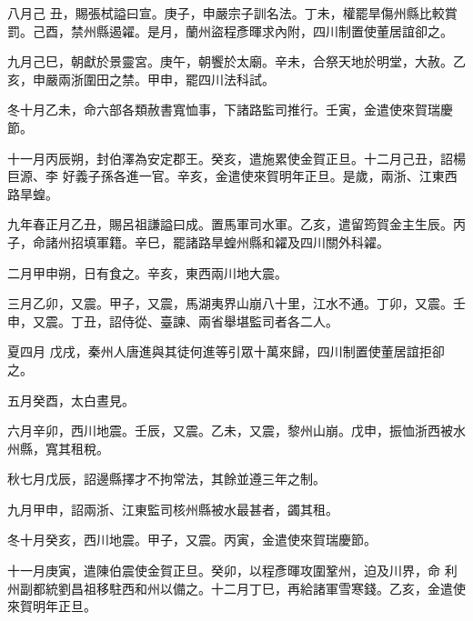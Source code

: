 \begin{pinyinscope}
 八月己
 丑，賜張栻謚曰宣。庚子，申嚴宗子訓名法。丁未，權罷旱傷州縣比較賞罰。己酉，禁州縣遏糴。是月，蘭州盜程彥暉求內附，四川制置使董居誼卻之。



 九月己巳，朝獻於景靈宮。庚午，朝饗於太廟。辛未，合祭天地於明堂，大赦。乙亥，申嚴兩浙圍田之禁。甲申，罷四川法科試。



 冬十月乙未，命六部各類赦書寬恤事，下諸路監司推行。壬寅，金遣使來賀瑞慶節。



 十一月丙辰朔，封伯澤為安定郡王。癸亥，遣施累使金賀正旦。十二月己丑，詔楊巨源、李
 好義子孫各進一官。辛亥，金遣使來賀明年正旦。是歲，兩浙、江東西路旱蝗。



 九年春正月乙丑，賜呂祖謙謚曰成。置馬軍司水軍。乙亥，遣留筠賀金主生辰。丙子，命諸州招填軍籍。辛巳，罷諸路旱蝗州縣和糴及四川關外科糴。



 二月甲申朔，日有食之。辛亥，東西兩川地大震。



 三月乙卯，又震。甲子，又震，馬湖夷界山崩八十里，江水不通。丁卯，又震。壬申，又震。丁丑，詔侍從、臺諫、兩省舉堪監司者各二人。



 夏四月
 戊戌，秦州人唐進與其徒何進等引眾十萬來歸，四川制置使董居誼拒卻之。



 五月癸酉，太白晝見。



 六月辛卯，西川地震。壬辰，又震。乙未，又震，黎州山崩。戊申，振恤浙西被水州縣，寬其租稅。



 秋七月戊辰，詔邊縣擇才不拘常法，其餘並遵三年之制。



 九月甲申，詔兩浙、江東監司核州縣被水最甚者，蠲其租。



 冬十月癸亥，西川地震。甲子，又震。丙寅，金遣使來賀瑞慶節。



 十一月庚寅，遣陳伯震使金賀正旦。癸卯，以程彥暉攻圍鞏州，迫及川界，命
 利州副都統劉昌祖移駐西和州以備之。十二月丁巳，再給諸軍雪寒錢。乙亥，金遣使來賀明年正旦。



\end{pinyinscope}